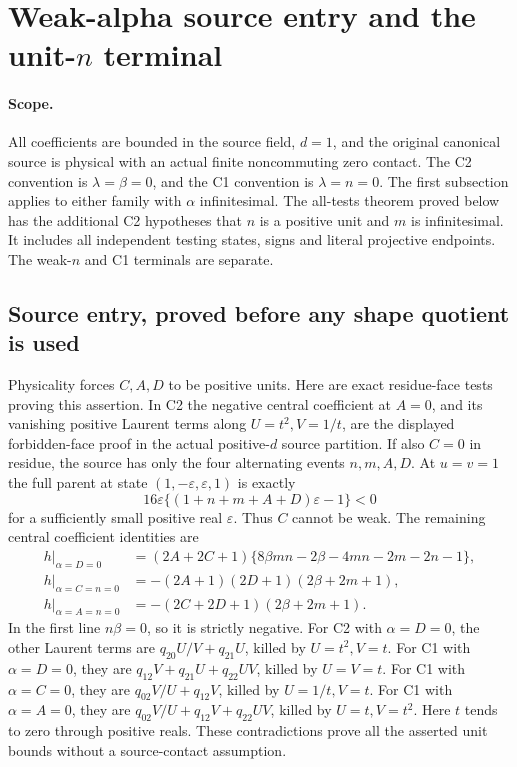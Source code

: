 \section{Weak-alpha source entry and the unit-\(n\) terminal}
\label{sec:new-weak-alpha-unit-n}

\paragraph{Scope.}
All coefficients are bounded in the source field, \(d=1\), and the
original canonical source is physical with an actual finite noncommuting
zero contact. The C2 convention is \(\lambda=\beta=0\), and the C1
convention is \(\lambda=n=0\). The first subsection applies to either
family with \(\alpha\) infinitesimal. The all-tests theorem proved below
has the additional C2 hypotheses that \(n\) is a positive unit and \(m\)
is infinitesimal. It includes all independent testing states, signs and
literal projective endpoints. The weak-\(n\) and C1 terminals are separate.

\subsection{Source entry, proved before any shape quotient is used}

Physicality forces \(C,A,D\) to be positive units. Here are exact
residue-face tests proving this assertion. In C2 the negative central
coefficient at \(A=0\), and its vanishing positive Laurent terms along
\(U=t^2,V=1/t\), are the displayed forbidden-face proof in the actual
positive-\(d\) source partition. If also \(C=0\) in residue, the source
has only the four alternating events \(n,m,A,D\). At \(u=v=1\) the full
parent at state \((1,-\varepsilon,\varepsilon,1)\) is exactly
\[
 16\varepsilon\{(1+n+m+A+D)\varepsilon-1\}<0
 \tag{WA1}
\]
for a sufficiently small positive real \(\varepsilon\).
Thus \(C\) cannot be weak. The remaining central coefficient identities
are
\[
\begin{aligned}
h|_{\alpha=D=0}
 &=(2A+2C+1)\{8\beta mn-2\beta-4mn-2m-2n-1\},\\
h|_{\alpha=C=n=0}
 &=-(2A+1)(2D+1)(2\beta+2m+1),\\
h|_{\alpha=A=n=0}
 &=-(2C+2D+1)(2\beta+2m+1).
\end{aligned}\tag{WA2}
\]
In the first line \(n\beta=0\), so it is strictly negative. For C2
with \(\alpha=D=0\), the other Laurent terms are
\(q_{20}U/V+q_{21}U\), killed by \(U=t^2,V=t\).
For C1 with \(\alpha=D=0\), they are
\(q_{12}V+q_{21}U+q_{22}UV\), killed by \(U=V=t\).
For C1 with \(\alpha=C=0\), they are \(q_{02}V/U+q_{12}V\),
killed by \(U=1/t,V=t\). For C1 with \(\alpha=A=0\), they are
\(q_{02}V/U+q_{12}V+q_{22}UV\), killed by \(U=t,V=t^2\).
Here \(t\) tends to zero through positive reals. These contradictions
prove all the asserted unit bounds without a source-contact assumption.

